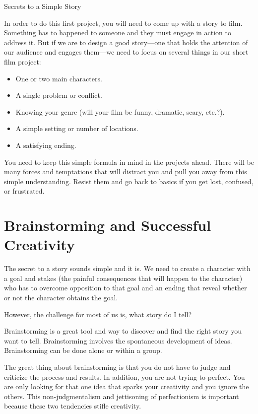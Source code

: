 \documentclass[
]{book}
\providecommand{\tightlist}{%
  \setlength{\itemsep}{0pt}\setlength{\parskip}{0pt}}
\begin{document}
{ Secrets to a Simple Story}

In order to do this first project, you will need to come up with a story to film. Something has to happened to someone and they must engage in action to address it. But if we are to design a good story---one that holds the attention of our audience and engages them---we need to focus on several things in our short film project:

\begin{itemize}
\tightlist
\item
  One or two main characters.\\
\item
  A single problem or conflict.\\
\item
  Knowing your genre (will your film be funny, dramatic, scary, etc.?).\\
\item
  A simple setting or number of locations.\\
\item
  A satisfying ending.
\end{itemize}

You need to keep this simple formula in mind in the projects ahead. There will be many forces and temptations that will distract you and pull you away from this simple understanding. Resist them and go back to basics if you get lost, confused, or frustrated.

\hypertarget{brainstorming-and-successful-creativity}{%
\section{Brainstorming and Successful Creativity}\label{brainstorming-and-successful-creativity}}

The secret to a story sounds simple and it is. We need to create a character with a goal and stakes (the painful consequences that will happen to the character) who has to overcome opposition to that goal and an ending that reveal whether or not the character obtains the goal.

However, the challenge for most of us is, what story do I tell?

Brainstorming is a great tool and way to discover and find the right story you want to tell. Brainstorming involves the spontaneous development of ideas. Brainstorming can be done alone or within a group.

The great thing about brainstorming is that you do not have to judge and criticize the process and results. In addition, you are not trying to perfect. You are only looking for that one idea that sparks your creativity and you ignore the others. This non-judgmentalism and jettisoning of perfectionism is important because these two tendencies stifle creativity.
\end{document}
